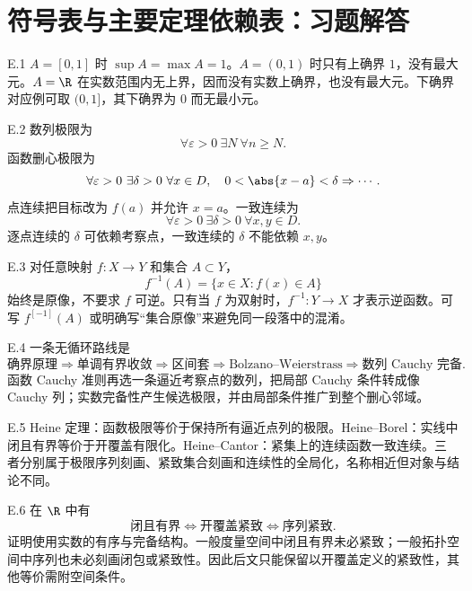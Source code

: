 \chapter{符号表与主要定理依赖表：习题解答}

\begin{solution}{E.1}
\(A=[0,1]\) 时 \(\sup A=\max A=1\)。\(A=(0,1)\) 时只有上确界 \(1\)，没有最大元。\(A=\R\) 在实数范围内无上界，因而没有实数上确界，也没有最大元。下确界对应例可取 \((0,1]\)，其下确界为 \(0\) 而无最小元。
\end{solution}

\begin{solution}{E.2}
数列极限为
\[
 \forall\varepsilon>0\ \exists N\ \forall n\ge N.
\]
函数删心极限为
\[
 \forall\varepsilon>0\ \exists\delta>0\ \forall x\in D,\quad
 0<\abs{x-a}<\delta\Rightarrow\cdots.
\]
点连续把目标改为 \(f(a)\) 并允许 \(x=a\)。一致连续为
\[
 \forall\varepsilon>0\ \exists\delta>0\ \forall x,y\in D.
\]
逐点连续的 \(\delta\) 可依赖考察点，一致连续的 \(\delta\) 不能依赖 \(x,y\)。
\end{solution}

\begin{solution}{E.3}
对任意映射 \(f:X\to Y\) 和集合 \(A\subset Y\)，
\[
 f^{-1}(A)=\{x\in X:f(x)\in A\}
\]
始终是原像，不要求 \(f\) 可逆。只有当 \(f\) 为双射时，\(f^{-1}:Y\to X\) 才表示逆函数。可写 \(f^{[-1]}(A)\) 或明确写“集合原像”来避免同一段落中的混淆。
\end{solution}

\begin{solution}{E.4}
一条无循环路线是
\[
 \text{确界原理}\Rightarrow
 \text{单调有界收敛}\Rightarrow
 \text{区间套}\Rightarrow
 \text{Bolzano--Weierstrass}\Rightarrow
 \text{数列 Cauchy 完备}.
\]
函数 Cauchy 准则再选一条逼近考察点的数列，把局部 Cauchy 条件转成像 Cauchy 列；实数完备性产生候选极限，并由局部条件推广到整个删心邻域。
\end{solution}

\begin{solution}{E.5}
Heine 定理：函数极限等价于保持所有逼近点列的极限。Heine--Borel：实线中闭且有界等价于开覆盖有限化。Heine--Cantor：紧集上的连续函数一致连续。三者分别属于极限序列刻画、紧致集合刻画和连续性的全局化，名称相近但对象与结论不同。
\end{solution}

\begin{solution}{E.6}
在 \(\R\) 中有
\[
 \text{闭且有界}\Longleftrightarrow
 \text{开覆盖紧致}\Longleftrightarrow
 \text{序列紧致}.
\]
证明使用实数的有序与完备结构。一般度量空间中闭且有界未必紧致；一般拓扑空间中序列也未必刻画闭包或紧致性。因此后文只能保留以开覆盖定义的紧致性，其他等价需附空间条件。
\end{solution}

